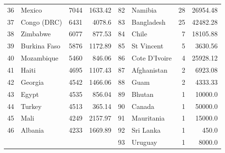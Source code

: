 \begin{longtable}{|c|l|r|r|c|l|r|r|}
	36          & Mexico                & 7044                   & 1633.42                         & 82          & Namibia               & 28                     & 26954.48                        \\
	37          & Congo (DRC)           & 6431                   & 4078.6                          & 83          & Bangladesh            & 25                     & 42482.28                        \\
	38          & Zimbabwe              & 6077                   & 877.53                          & 84          & Chile                 & 7                      & 18105.88                        \\
	39          & Burkina Faso          & 5876                   & 1172.89                         & 85          & St Vincent            & 5                      & 3630.56                         \\
	40          & Mozambique            & 5460                   & 846.06                          & 86          & Cote D'Ivoire         & 4                      & 25928.12                        \\
	41          & Haiti                 & 4695                   & 1107.43                         & 87          & Afghanistan           & 2                      & 6923.08                         \\
	42          & Georgia               & 4542                   & 1466.06                         & 88          & Guam                  & 2                      & 4333.33                         \\
	43          & Egypt                 & 4535                   & 856.04                          & 89          & Bhutan                & 1                      & 10000.0                         \\
	44          & Turkey                & 4513                   & 365.14                          & 90          & Canada                & 1                      & 50000.0                         \\
	45          & Mali                  & 4249                   & 2157.97                         & 91          & Mauritania            & 1                      & 15000.0                         \\
	46          & Albania               & 4233                   & 1669.89                         & 92          & Sri Lanka             & 1                      & 450.0                           \\
	            &                       &                        &                                 & 93          & Uruguay               & 1                      & 8000.0                          \\
\end{longtable}

